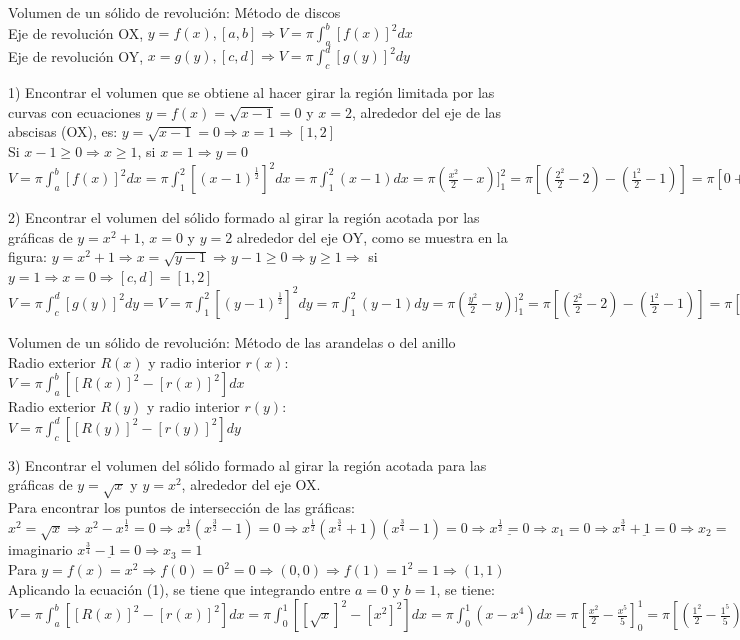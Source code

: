 \documentclass[12pt]{report}
\newcommand{\unit}[1]{\ensuremath{\, \mathrm{#1}}}
\begin{document}
    \hfill \break
    Volumen de un sólido de revolución: Método de discos\\
    Eje de revolución OX, $y = f(x), [a,b] \Longrightarrow V = \pi\int_a^b[f(x)]^2dx$ \\
    Eje de revolución OY, $x = g(y), [c,d] \Longrightarrow V = \pi\int_c^d[g(y)]^2dy$

    1) Encontrar el volumen que se obtiene al hacer girar la región limitada por las curvas con ecuaciones $y = f(x) = \sqrt{x-1} = 0$ y $x = 2$, alrededor del eje de las abscisas (OX), es: $y = \sqrt{x-1} = 0 \Rightarrow x = 1 \Rightarrow \boxed{[1, 2]}$ \\
    Si $x-1 \geq 0 \Rightarrow x \geq 1$, si $x = 1 \Rightarrow y = 0$ \\
    $V = \pi\int_a^b[f(x)]^2dx = \pi\int_1^2[(x-1)^{\frac{1}{2}}]^2dx = \pi\int_1^2(x-1)dx = \pi(\frac{x^2}{2}-x)]_1^2 = \pi[(\frac{2^2}{2}-2) - (\frac{1^2}{2}-1)] = \pi[0 + \frac{1}{2}] = \boxed{\frac{\pi}{2} \unit{u^3}}$

    2) Encontrar el volumen del sólido formado al girar la región acotada por las gráficas de $y = x^2+1$, $x= 0$ y $y = 2$ alrededor del eje OY, como se muestra en la figura: $y = x^2+1 \Rightarrow x = \sqrt{y-1} \Rightarrow y-1 \geq 0 \Rightarrow y \geq 1 \Rightarrow$ si $y = 1 \Rightarrow x = 0 \Rightarrow [c, d] =\boxed{[1, 2]}$ \\
    $V = \pi\int_c^d[g(y)]^2dy = V = \pi\int_1^2[(y-1)^{\frac{1}{2}}]^2dy = \pi\int_1^2(y-1)dy = \pi(\frac{y^2}{2}-y)]_1^2 = \pi[(\frac{2^2}{2}-2) - (\frac{1^2}{2}-1)] = \pi[0 - (-\frac{1}{2})] = \boxed{\frac{\pi}{2} \unit{u^3}}$

    \hfill \break 
    Volumen de un sólido de revolución: Método de las arandelas o del anillo \\ 
    Radio exterior $R(x)$ y radio interior $r(x)$: $V = \pi\int_a^b[[R(x)]^2-[r(x)]^2]dx$ \\  
    Radio exterior $R(y)$ y radio interior $r(y)$: $V = \pi\int_c^d[[R(y)]^2-[r(y)]^2]dy$ 

    3) Encontrar el volumen del sólido formado al girar la región acotada para las gráficas de $y = \sqrt{x}$ y $y = x^2$, alrededor del eje OX. \\
    Para encontrar los puntos de intersección de las gráficas: $x^2 = \sqrt{x} \Rightarrow x^2 - x^{\frac{1}{2}} = 0 \Rightarrow x^{\frac{1}{2}}(x^{\frac{3}{2}}-1) = 0 \Rightarrow x^{\frac{1}{2}}(x^{\frac{3}{4}} + 1)(x^{\frac{3}{4}} - 1) = 0 \Rightarrow \underline{x^{\frac{1}{2}} = 0} \Rightarrow x_1 = 0 \Rightarrow \underline{x^{\frac{3}{4}} + 1 = 0} \Rightarrow x_2 =$ imaginario $\underline{x^{\frac{3}{4}} - 1 = 0} \Rightarrow x_3 = 1$ \\
    Para $y = f(x) = x^2 \Longrightarrow f(0) = 0^2 = 0 \Rightarrow \boxed{(0,0)} \Longrightarrow f(1) = 1^2 = 1 \Rightarrow \boxed{(1,1)}$ \\
    Aplicando la ecuación (1), se tiene que integrando entre $a = 0$ y $b = 1$, se tiene: $V = \pi\int_a^b[[R(x)]^2-[r(x)]^2]dx = \pi\int_0^1[[\sqrt{x}]^2-[x^2]^2]dx = \pi\int_0^1(x-x^4)dx = \pi[\frac{x^2}{2} - \frac{x^5}{5}]_0^1 = \pi[(\frac{1^2}{2} - \frac{1^5}{5}) - 0] = \pi(\frac{1}{2} - \frac{1}{5}) = \pi(\frac{5-2}{10}) = \pi(\frac{3}{10}) = \boxed{\frac{3\pi}{10} \unit{u^3}}$
    
\end{document}
